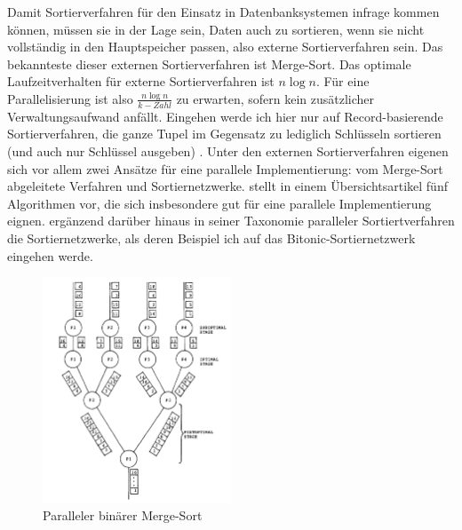 \documentclass[a4paper,12pt,twoside]{article}
\begin{document}
Damit Sortierverfahren für den Einsatz in Datenbanksystemen infrage kommen können, müssen sie in der Lage sein, Daten auch zu sortieren, wenn sie nicht vollständig in den Hauptspeicher passen, also externe Sortierverfahren sein. Das bekannteste dieser externen Sortierverfahren ist Merge-Sort. Das optimale Laufzeitverhalten für externe Sortierverfahren ist $ n \log n $. Für eine Parallelisierung ist also $ \frac{n \log n} {k-Zahl} $ zu erwarten, sofern kein zusätzlicher Verwaltungsaufwand anfällt. Eingehen werde ich hier nur auf Record-basierende Sortierverfahren, die ganze Tupel im Gegensatz zu lediglich Schlüsseln sortieren (und auch nur Schlüssel ausgeben) {\autocite{Salzberg1990}}. Unter den externen Sortierverfahren eigenen sich vor allem zwei Ansätze für eine parallele Implementierung: vom Merge-Sort abgeleitete Verfahren und Sortiernetzwerke. {\textcite[S. 831ff]{Taniar2000}} stellt in einem Übersichtsartikel fünf Algorithmen vor, die sich insbesondere gut für eine parallele Implementierung eignen. {\textcite[S. 9ff] {Bitton1984}} ergänzend darüber hinaus in seiner Taxonomie paralleler Sortiertverfahren die Sortiernetzwerke, als deren Beispiel ich auf das Bitonic-Sortiernetzwerk eingehen werde.

\begin{figure}
	\centering
	\includegraphics[width=0.5\textwidth, angle =90]{Bilder/b-merge-sort.png}
	\caption{Paralleler binärer Merge-Sort \autocite[S. 334]{Bitton1983}}
	\label{img:bMergeSort}
\end{figure}
\end{document}
